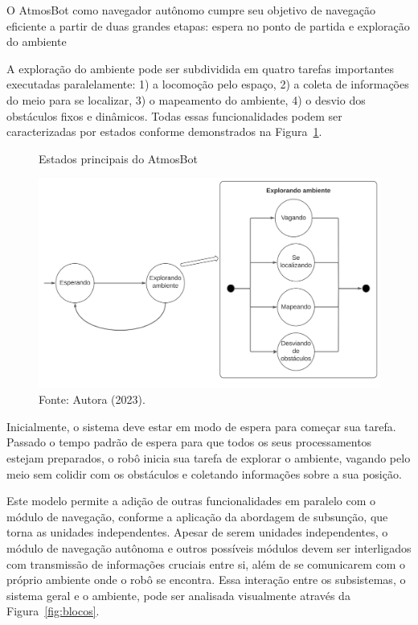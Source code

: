 O AtmosBot como navegador autônomo cumpre seu objetivo de navegação eficiente a partir de duas grandes etapas: espera no ponto de partida e exploração do ambiente

A exploração do ambiente pode ser subdividida em quatro tarefas importantes executadas paralelamente: 1) a locomoção pelo espaço, 2) a coleta de informações do meio para se localizar, 3) o mapeamento do ambiente, 4) o desvio dos obstáculos fixos e dinâmicos. Todas essas funcionalidades podem ser caracterizadas por estados conforme demonstrados na Figura~\ref{fig:estados}. 

\begin{figure}[h]
    \centering
    \caption{Estados principais do AtmosBot}
    \includegraphics[scale=0.45]{estados.png}
    \caption*{Fonte: Autora (2023).}
    \label{fig:estados}
\end{figure}


Inicialmente, o sistema deve estar em modo de espera para começar sua tarefa. Passado o tempo padrão de espera para que todos os seus processamentos estejam preparados, o robô inicia sua tarefa de explorar o ambiente, vagando pelo meio sem colidir com os obstáculos e coletando informações sobre a sua posição. 

Este modelo permite a adição de outras funcionalidades em paralelo com o módulo de navegação, conforme a aplicação da abordagem de subsunção, que torna as unidades independentes. Apesar de serem unidades independentes, o módulo de navegação autônoma e outros possíveis módulos devem ser interligados com transmissão de informações cruciais entre si, além de se comunicarem com o próprio ambiente onde o robô se encontra. Essa interação entre os subsistemas, o sistema geral e o ambiente, pode ser analisada visualmente através da Figura~\ref{fig:blocos}.  

